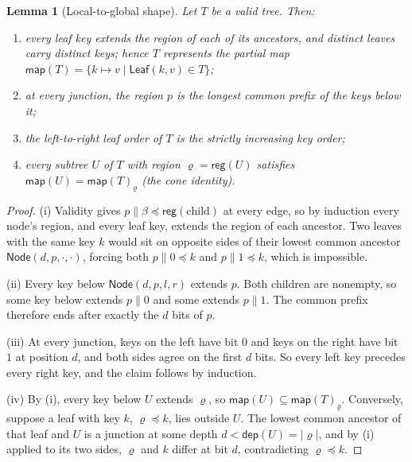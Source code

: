 \documentclass[11pt]{article}
\newtheorem{lemma}{Lemma}
\begin{document}
\begin{lemma}[Local-to-global shape]
\label{lem:shape}
Let $T$ be a valid tree. Then:
\begin{enumerate}[nosep,label=(\roman*)]
  \item every leaf key extends the region of each of its ancestors, and distinct leaves carry distinct keys; hence $T$ represents the partial map $\mathsf{map}(T) = \{k \mapsto v \mid \mathsf{Leaf}(k,v) \in T\}$;
  \item at every junction, the region $p$ is the longest common prefix of the keys below it;
  \item the left-to-right leaf order of $T$ is the strictly increasing key order;
  \item every subtree $U$ of $T$ with region $\varrho = \mathsf{reg}(U)$ satisfies $\mathsf{map}(U) = \mathsf{map}(T)_\varrho$ (the \emph{cone identity}).
\end{enumerate}
\end{lemma}
\begin{proof}
(i) Validity gives $p\|\beta \preceq \mathsf{reg}(\text{child})$ at every edge, so by induction every node's region, and every leaf key, extends the region of each ancestor. Two leaves with the same key $k$ would sit on opposite sides of their lowest common ancestor $\mathsf{Node}(d,p,\cdot,\cdot)$, forcing both $p\|0 \preceq k$ and $p\|1 \preceq k$, which is impossible.

(ii) Every key below $\mathsf{Node}(d,p,l,r)$ extends $p$. Both children are nonempty, so some key below extends $p\|0$ and some extends $p\|1$. The common prefix therefore ends after exactly the $d$ bits of $p$.

(iii) At every junction, keys on the left have bit $0$ and keys on the right have bit $1$ at position $d$, and both sides agree on the first $d$ bits. So every left key precedes every right key, and the claim follows by induction.

(iv) By (i), every key below $U$ extends $\varrho$, so $\mathsf{map}(U) \subseteq \mathsf{map}(T)_\varrho$. Conversely, suppose a leaf with key $k$, $\varrho \preceq k$, lies outside $U$. The lowest common ancestor of that leaf and $U$ is a junction at some depth $d < \mathsf{dep}(U) = |\varrho|$, and by (i) applied to its two sides, $\varrho$ and $k$ differ at bit $d$, contradicting $\varrho \preceq k$.
\end{proof}
\end{document}
